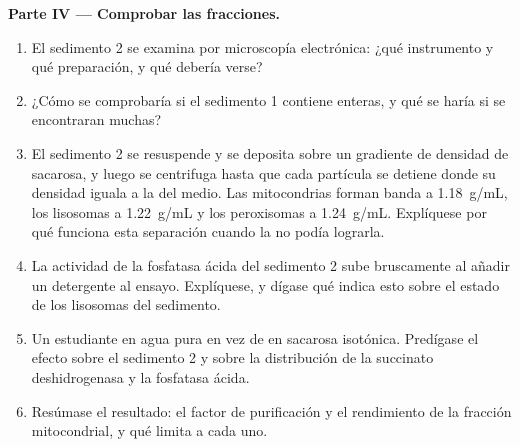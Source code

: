 \begin{problem}
\medskip
\noindent\textbf{Parte IV --- Comprobar las fracciones.}
\begin{enumerate}[resume]
  \item El sedimento 2 se examina por microscopía electrónica: ¿qué
        instrumento y qué preparación, y qué debería verse?
  \item ¿Cómo se comprobaría si el sedimento 1 contiene  enteras, y
        qué se haría si se encontraran muchas?
  \item El sedimento 2 se resuspende y se deposita sobre un gradiente de
        densidad de sacarosa, y luego se centrifuga hasta que cada
        partícula se detiene donde su densidad iguala a la del medio. Las
        mitocondrias forman banda a \qty{1.18}{g/mL}, los lisosomas a
        \qty{1.22}{g/mL} y los peroxisomas a \qty{1.24}{g/mL}. Explíquese
        por qué funciona esta separación cuando la  no podía lograrla.
  \item La actividad de la fosfatasa ácida del sedimento 2 sube bruscamente
        al añadir un detergente al ensayo. Explíquese, y dígase qué indica
        esto sobre el estado de los lisosomas del sedimento.
  \item Un estudiante  en agua pura en vez de en sacarosa
        isotónica. Predígase el efecto sobre el sedimento 2 y sobre la
        distribución de la succinato deshidrogenasa y la fosfatasa ácida.
  \item Resúmase el resultado: el factor de purificación y el rendimiento
        de la fracción mitocondrial, y qué limita a cada uno.
\end{enumerate}
\end{problem}
